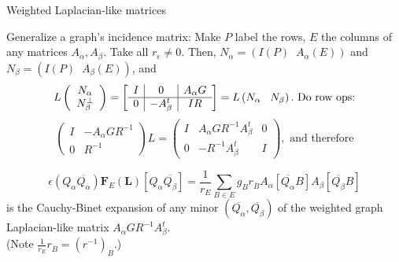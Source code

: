 \documentclass{beamer}
\newcommand{\ext}[1]{\ensuremath{\mathbf{#1}}}
\begin{document}
\begin{frame}{Weighted Laplacian-like matrices}

  Generalize a graph's incidence matrix: Make $P$ label the rows,
  $E$ the columns of any matrices $A_\alpha,A_\beta$.  Take all $r_e\neq 0$.
  Then,
  $N_\alpha = ( I(P)\;\; A_\alpha(E))$ and $N_\beta= (I(P)\;\; A_\beta(E))$, and
  \vspace{-0.1in}
   \[
    L\left( \begin{array}{c} N_{\alpha}\\ N_{\beta}^{\perp} \end{array} \right)
    = \left[\begin{array}{c|c|c} I  &  0  &  A_\alpha  G \\  \hline
0  & -A_\beta^t  &  IR \end{array}\right] = L\left( N_{\alpha}\;\;\; N_\beta \right). \text{\ Do row ops:}
    \]
    \vspace{-0.1in}
    \[
    \left(\begin{array}{cc} I & -A_\alpha  G R^{-1} \\
      0 & R^{-1} \end{array} \right) L
    = \left(\begin{array}{ccc}
        I & A_\alpha GR^{-1}A_\beta^t& 0 \\
        0 & -R^{-1}A_\beta ^t    & I
        \end{array} \right), \text{\ and therefore}
    \]

    \[
    \epsilon(Q_\alpha\overline{Q_\alpha})\ext{F}_E(\ext{L})[Q_\alpha \overline{Q_\beta}] =
       \frac{1}{r_E} \sum_{B\in E}g_B r_{\overline{B}} A_\alpha[\overline{Q_\alpha} B] A_\beta[{\overline{Q_\beta}}B]  
    \]
    is the Cauchy-Binet expansion of any  minor $(\overline{Q_\alpha},\overline{Q_\beta})$ of the
    weighted graph Laplacian-like matrix $A_\alpha GR^{-1}A_\beta^t$.\\
    (Note $\frac{1}{r_E}r_{\overline B}=(r^{-1})_B$.)
\end{frame}
\end{document}
